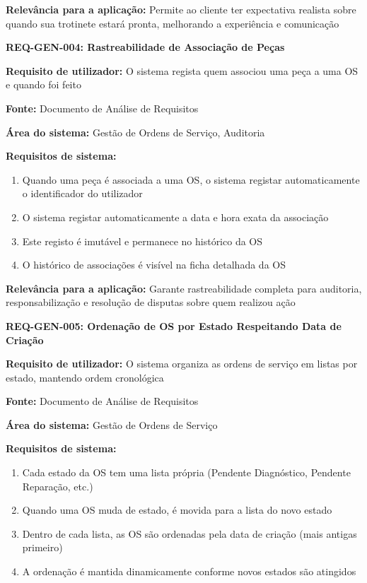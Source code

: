 \documentclass[11pt,a4paper]{article}
\newcommand{\reqheader}[1]{{\noindent\large\bfseries\color{sectionblue}#1}\par\vspace{0.3cm}}
\newcommand{\reqfield}[2]{{\noindent\textbf{#1:} #2}\par\vspace{0.2cm}}
\begin{document}
\reqfield{Relevância para a aplicação}{Permite ao cliente ter expectativa realista sobre quando sua trotinete estará pronta, melhorando a experiência e comunicação}

\vspace{0.8cm}

\reqheader{REQ-GEN-004: Rastreabilidade de Associação de Peças}

\reqfield{Requisito de utilizador}{O sistema regista quem associou uma peça a uma OS e quando foi feito}

\reqfield{Fonte}{Documento de Análise de Requisitos}

\reqfield{Área do sistema}{Gestão de Ordens de Serviço, Auditoria}

\reqfield{Requisitos de sistema}{
	\begin{enumerate}
		\item Quando uma peça é associada a uma OS, o sistema registar automaticamente o identificador do utilizador
		\item O sistema registar automaticamente a data e hora exata da associação
		\item Este registo é imutável e permanece no histórico da OS
		\item O histórico de associações é visível na ficha detalhada da OS
	\end{enumerate}
}

\reqfield{Relevância para a aplicação}{Garante rastreabilidade completa para auditoria, responsabilização e resolução de disputas sobre quem realizou ação}

\vspace{0.8cm}

\reqheader{REQ-GEN-005: Ordenação de OS por Estado Respeitando Data de Criação}

\reqfield{Requisito de utilizador}{O sistema organiza as ordens de serviço em listas por estado, mantendo ordem cronológica}

\reqfield{Fonte}{Documento de Análise de Requisitos}

\reqfield{Área do sistema}{Gestão de Ordens de Serviço}

\reqfield{Requisitos de sistema}{
	\begin{enumerate}
		\item Cada estado da OS tem uma lista própria (Pendente Diagnóstico, Pendente Reparação, etc.)
		\item Quando uma OS muda de estado, é movida para a lista do novo estado
		\item Dentro de cada lista, as OS são ordenadas pela data de criação (mais antigas primeiro)
		\item A ordenação é mantida dinamicamente conforme novos estados são atingidos
	\end{enumerate}
}
\end{document}
